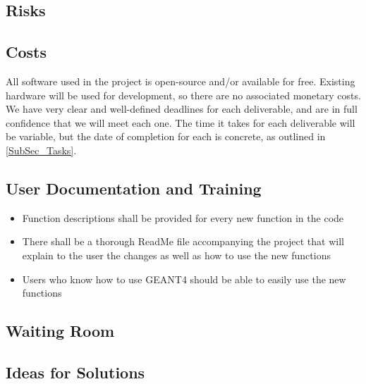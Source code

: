 \documentclass[12pt]{article}
\begin{document}
\subsection{Risks} %

\subsection{Costs} %
All software used in the project is open-source and/or available for free. Existing hardware will be used for development, so there are no associated monetary costs.\\

We have very clear and well-defined deadlines for each deliverable, and are in full confidence that we will meet each one. The time it takes for each deliverable will be variable, but the date of completion for each is concrete, as outlined in \ref{SubSec_Tasks}.

\subsection{User Documentation and Training} %
\begin{itemize}
	\item Function descriptions shall be provided for every new function in the code
	\item There shall be a thorough ReadMe file accompanying the project that will explain to the user the changes as well as how to use the new functions
	\item Users who know how to use GEANT4 should be able to easily use the new functions
\end{itemize}

\subsection{Waiting Room} %

\subsection{Ideas for Solutions} %
\end{document}
